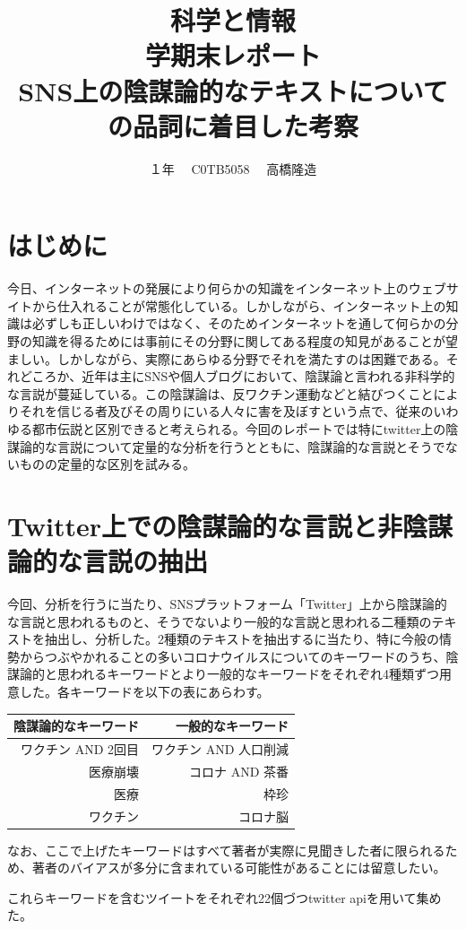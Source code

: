 \documentclass[a4paper, dvipdfmx]{jsarticle}
\title{科学と情報\\ 学期末レポート\\ SNS上の陰謀論的なテキストについての品詞に着目した考察}
\author{１年 \ \ C0TB5058  \ \ 高橋隆造   }
\begin{document}
\maketitle
\newpage
\section{はじめに}
今日、インターネットの発展により何らかの知識をインターネット上のウェブサイトから仕入れることが常態化している。しかしながら、インターネット上の知識は必ずしも正しいわけではなく、そのためインターネットを通して何らかの分野の知識を得るためには事前にその分野に関してある程度の知見があることが望ましい。しかしながら、実際にあらゆる分野でそれを満たすのは困難である。それどころか、近年は主にSNSや個人ブログにおいて、陰謀論と言われる非科学的な言説が蔓延している。この陰謀論は、反ワクチン運動などと結びつくことによりそれを信じる者及びその周りにいる人々に害を及ぼすという点で、従来のいわゆる都市伝説と区別できると考えられる。今回のレポートでは特にtwitter上の陰謀論的な言説について定量的な分析を行うとともに、陰謀論的な言説とそうでないものの定量的な区別を試みる。
\section{Twitter上での陰謀論的な言説と非陰謀論的な言説の抽出}
今回、分析を行うに当たり、SNSプラットフォーム「Twitter」上から陰謀論的な言説と思われるものと、そうでないより一般的な言説と思われる二種類のテキストを抽出し、分析した。2種類のテキストを抽出するに当たり、特に今般の情勢からつぶやかれることの多いコロナウイルスについてのキーワードのうち、陰謀論的と思われるキーワードとより一般的なキーワードをそれぞれ4種類ずつ用意した。各キーワードを以下の表にあらわす。
\begin{table}[ht]
\centering
\begin{tabular}{rr}
陰謀論的なキーワード & 一般的なキーワード \\
 \hline
ワクチン AND 2回目 & ワクチン AND 人口削減 \\
医療崩壊 & コロナ AND 茶番 \\
医療 & 枠珍 \\
ワクチン & コロナ脳 \\
  \hline
\end{tabular}
\end{table}
なお、ここで上げたキーワードはすべて著者が実際に見聞きした者に限られるため、著者のバイアスが多分に含まれている可能性があることには留意したい。
\par
これらキーワードを含むツイートをそれぞれ22個づつtwitter api\cite{s1}を用いて集めた。
\end{document}
